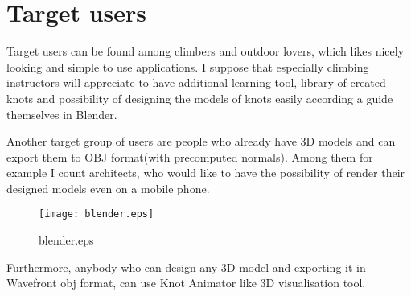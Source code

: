 \section*{Target users} %
\label{sec:Target users}
Target users can be found among climbers and outdoor lovers,
which likes nicely looking and simple to use applications.  
I suppose that especially climbing instructors will appreciate
to have additional learning tool, library of created knots and possibility 
of designing the models of knots easily according a guide themselves in Blender. 

Another target group of users are people who already have 3D models and can export them 
to OBJ format(with precomputed normals). Among them for example I count architects, who 
would like to have the possibility of render their designed models even on a mobile phone.

\begin{figure}
\begin{center}
\texttt{[image: blender.eps]}
\label{pic:blender.eps}
\caption{blender.eps}
\end{center}
\end{figure}

Furthermore, anybody who can design any 3D model and exporting it in Wavefront obj
format, can use Knot Animator like 3D visualisation tool.

